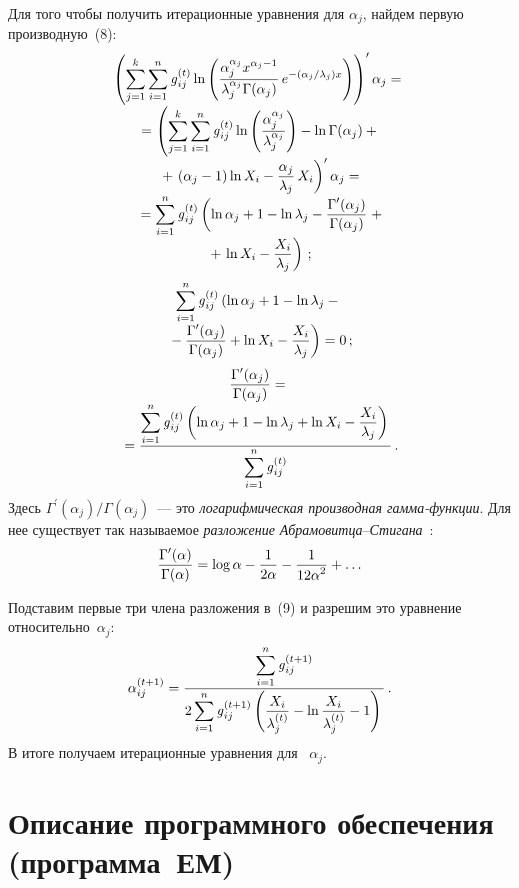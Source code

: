 \begin{multicols}{2}
Для того чтобы получить итерационные уравнения для $\alpha_j$, найдем
первую производную~(8):
\begin{multline*}
\left ( \sum\limits_{j=1}^k\sum\limits_{i=1}^n \g_{ij}^{(t)}\ln \left (
\fr{\alpha_j^{\alpha_j} x^{\alpha_j -1}}{\lambda_j^{\alpha_j}\Gamma (\alpha_j
)}\,e^{-(\alpha_j /\lambda_j ) x} \right ) \right )^\prime \alpha_j ={}\\[-3pt]
{}=\left ( \sum\limits_{j=1}^k\sum\limits_{i=1}^n \g_{ij}^{(t)}\ln \left (
\fr{\alpha_j^{\alpha_j}}{\lambda_j^{\alpha_j}}\right ) - \ln \Gamma (\alpha_j )+{} \right.\\[-3pt]
{}+\left.
(\alpha_j -1 )\ln X_i - \fr{\alpha_j}{\lambda_j}\,X_i \right )^\prime \alpha_j =\\[-3pt]
{}=\sum\limits_{i=1}^n \g_{ij}^{(t)} \left ( \ln \alpha_j +1-\ln \lambda_j -
\fr{\Gamma^\prime (\alpha_j )}{\Gamma (\alpha_j)}\right.+\\[-3pt]
{}+\left. \ln X_i - \fr{X_i}{\lambda_j}\right )\,;
\end{multline*}
\begin{multline*}
\sum\limits_{i=1}^n \g_{ij}^{(t)} \left(  \ln \alpha_j +1 -\ln \lambda_j -{}\right. \\[-3pt]
\left. {}-\fr{\Gamma^\prime (\alpha_j )}{\Gamma (\alpha_j )}+\ln X_i 
-\fr{X_i}{\lambda_j} \right) =0\,;
\end{multline*}
\begin{multline}
\fr{\Gamma^\prime (\alpha_j )}{\Gamma (\alpha_j )} ={}\\[-3pt]
{}= \fr{\sum\limits_{i=1}^n \g_{ij}^{(t)} \left ( \ln \alpha_j +1-\ln\lambda_j 
+\ln X_i -\fr{X_i}{\lambda_j} \right )}{\sum\limits_{i=1}^n \g_{ij}^{(t)}}\,.
\end{multline}
%
Здесь $\Gamma^\prime (\alpha_j ) / \Gamma (\alpha_j )$~--- это
\textit{логарифмическая производная гамма-функции}. Для нее существует так
называемое \textit{разложение Абрамовитца}--\textit{Стигана}~\cite{4bat}:
$$
\fr{\Gamma^\prime (\alpha ) }{ \Gamma (\alpha )} = \mathrm{log}\,\alpha -
\fr{1}{2\alpha }-\fr{1}{12\alpha^2 }+\ldots
$$

Подставим первые три члена разложения в~(9) и разрешим это уравнение
относительно~$\alpha_j$:
$$
\alpha_{ij}^{(t+1)} = \fr{\sum\limits_{i=1}^n
\g_{ij}^{(t+1)}}{2\sum\limits_{i=1}^n \g_{ij}^{(t +1)}\left ( \fr{X_i}{\lambda_j^{(t)}} -
\ln \fr{X_i}{\lambda_j^{(t)}} -1\right )}\,.
$$
В итоге получаем итерационные уравнения для ~$\alpha_j$.

\section{Описание программного обеспечения (программа~ЕМ)}


\end{multicols}
